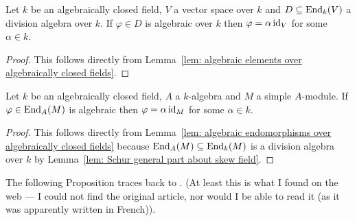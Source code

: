 \begin{lemma}\label{lem: algebraic endomorphisms over algebraically closed fields}
 Let $k$ be an algebraically closed field, $V$ a vector space over $k$ and $D \subseteq \operatorname{End}_k(V)$ a division algebra over $k$. If $\varphi \in D$ is algebraic over $k$ then $\varphi = \alpha \operatorname{id}_V$ for some $\alpha \in k$.
\end{lemma}
\begin{proof}
 This follows directly from Lemma~\ref{lem: algebraic elements over algebraically closed fields}.
\end{proof}


\begin{corollary}\label{cor: Schur generally needs only algebraic endomorphisms}
 Let $k$ be an algebraically closed field, $A$ a $k$-algebra and $M$ a simple $A$-module. If $\varphi \in \operatorname{End}_A(M)$ is algebraic then $\varphi = \alpha \operatorname{id}_M$ for some $\alpha \in k$.
\end{corollary}
\begin{proof}
 This follows directly from Lemma~\ref{lem: algebraic endomorphisms over algebraically closed fields} because $\operatorname{End}_A(M) \subseteq \operatorname{End}_k(M)$ is a division algebra over $k$ by Lemma~\ref{lem: Schur general part about skew field}.
\end{proof}


The following Proposition traces back to \cite{Dixmier}. (At least this is what I found on the web --- I could not find the original article, nor would I be able to read it (as it was apparently written in French)).


